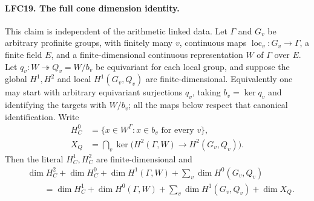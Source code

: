 \paragraph{LFC19. The full cone dimension identity.}
\label{claim:LFC19}
This claim is independent of the arithmetic linked data.
Let \(\Gamma\) and \(G_v\) be arbitrary profinite groups,
with finitely many \(v\), continuous maps
\(\operatorname{loc}_v:G_v\to\Gamma\), a finite field \(E\),
and a finite-dimensional continuous representation \(W\) of
\(\Gamma\) over \(E\).
Let \(q_v:W\twoheadrightarrow Q_v=W/b_v\) be equivariant
for each local group, and suppose the global \(H^1,H^2\)
and local \(H^1(G_v,Q_v)\) are finite-dimensional.
Equivalently one may start with arbitrary equivariant
surjections \(q_v\), taking \(b_v=\ker q_v\) and identifying
the targets with \(W/b_v\); all the maps below respect
that canonical identification.
Write
\[
 \begin{split}
 H^0_C&=\{x\in W^\Gamma:x\in b_v\text{ for every }v\},\\
 X_Q&=\bigcap_v\ker\bigl(H^2(\Gamma,W)\to H^2(G_v,Q_v)\bigr).
 \end{split}
 \]
Then the literal \(H^1_C,H^2_C\) are finite-dimensional and
\[
 \begin{split}
 &\dim H^2_C+\dim H^0_C+\dim H^1(\Gamma,W)
                       +\sum_v\dim H^0(G_v,Q_v)\\
 &\qquad=\dim H^1_C+\dim H^0(\Gamma,W)
                       +\sum_v\dim H^1(G_v,Q_v)+\dim X_Q.
 \end{split}                                           \tag{LFC.29}
\]

